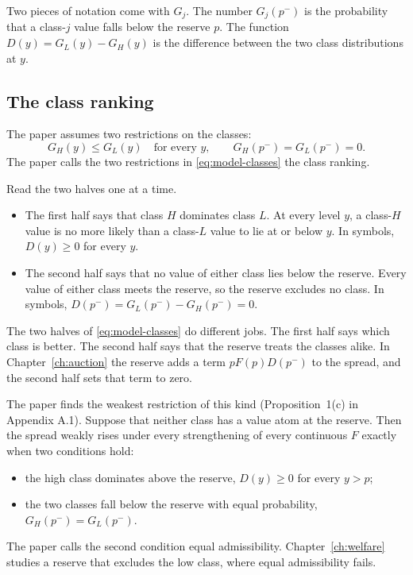 Two pieces of notation come with \(G_j\).
The number \(G_j(p^-)\) is the probability that a class-\(j\) value falls below the reserve \(p\).
The function \(D(y)=G_L(y)-G_H(y)\) is the difference between the two class distributions at \(y\).

\subsection*{The class ranking}

The paper assumes two restrictions on the classes:
\begin{equation}\label{eq:model-classes}
G_H(y)\le G_L(y)\quad\text{for every }y,\qquad G_H(p^-)=G_L(p^-)=0.
\end{equation}
The paper calls the two restrictions in \eqref{eq:model-classes} the class ranking.

Read the two halves one at a time.
\begin{itemize}
\item The first half says that class \(H\) dominates class \(L\). At every level \(y\), a class-\(H\) value is no more likely than a class-\(L\) value to lie at or below \(y\). In symbols, \(D(y)\ge0\) for every \(y\).
\item The second half says that no value of either class lies below the reserve. Every value of either class meets the reserve, so the reserve excludes no class. In symbols, \(D(p^-)=G_L(p^-)-G_H(p^-)=0\).
\end{itemize}

\begin{watchout}
The two halves of \eqref{eq:model-classes} do different jobs.
The first half says which class is better. The second half says that the reserve treats the classes alike.
In Chapter~\ref{ch:auction} the reserve adds a term \(pF(p)D(p^-)\) to the spread, and the second half sets that term to zero.

The paper finds the weakest restriction of this kind (Proposition~1(c) in Appendix A.1).
Suppose that neither class has a value atom at the reserve.
Then the spread weakly rises under every strengthening of every continuous \(F\) exactly when two conditions hold:
\begin{itemize}
\item the high class dominates above the reserve, \(D(y)\ge0\) for every \(y>p\);
\item the two classes fall below the reserve with equal probability, \(G_H(p^-)=G_L(p^-)\).
\end{itemize}
The paper calls the second condition equal admissibility.
Chapter~\ref{ch:welfare} studies a reserve that excludes the low class, where equal admissibility fails.
\end{watchout}

